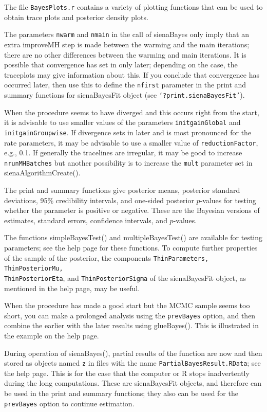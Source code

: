 \documentclass[a4paper,fleqn,11pt]{article}
\newcommand{\+}{\, + \,}
\newcommand{\sfn}[1]{\textsf{#1}}
\newcommand{\R}{{\sf R }}
\begin{document}
The file \texttt{BayesPlots.r} contains a variety of plotting functions that 
can be used to obtain trace plots and posterior density plots.

The parameters \texttt{nwarm} and \texttt{nmain} in the call of 
\sfn{sienaBayes} only imply 
that an extra \sfn{improveMH} step is made between the warming and the 
main iterations; there are no other differences between the warming 
and main iterations. It is possible that convergence has set in only 
later; depending on the case, the traceplots may give information about this.
If you conclude that convergence has occurred later, then use this to 
define the \texttt{nfirst} parameter in the \sfn{print} and 
\sfn{summary} functions for 
\sfn{sienaBayesFit} object (see \texttt{`?print.sienaBayesFit'}).

When the procedure seems to have diverged and this occurs right
from the start, it is
advisable to use smaller values of the parameters \texttt{initgainGlobal}
and \texttt{initgainGroupwise}.
If divergence sets in later and is most pronounced
for the rate parameters, it may be advisable to use a smaller value of 
\texttt{reductionFactor}, e.g., 0.1.
If generally the tracelines are irregular, it may be good to increase
\texttt{nrunMHBatches} but another possibility is to increase 
the \texttt{mult} parameter set in \sfn{sienaAlgorithmCreate()}. 

The \sfn{print} and \sfn{summary} functions
give posterior means, posterior standard deviations, 95\% credibility intervals,
and one-sided posterior $p$-values 
for testing whether the parameter is positive or negative. 
These are the Bayesian versions of estimates, standard errors, 
confidence intervals, and $p$-values.

The functions \sfn{simpleBayesTest()} and \sfn{multipleBayesTest()}
are available for testing parameters; see the help page for these functions.
To compute further properties of the sample of the posterior, 
the components
\texttt{ThinParameters, ThinPosteriorMu, \\
ThinPosteriorEta}, and \texttt{ThinPosteriorSigma} of the 
\sfn{sienaBayesFit} object, as mentioned in the help page, may be useful.

When the procedure has made a good start but the MCMC sample seems too 
short, you can make a prolonged analysis using the \texttt{prevBayes} option, 
and then combine the earlier with the later results using \sfn{glueBayes()}. 
This is illustrated in the example on the help page.

During operation of \sfn{sienaBayes()}, partial results of the function 
are now and then stored 
as objects named \texttt{z} in files with the name
\texttt{PartialBayesResult.RData}; see the help page.
This is for the case that the computer or \R stops inadvertently
during the long computations.
These are \sfn{sienaBayesFit} objects, and therefore can be used in the
\sfn{print} and \sfn{summary} functions; they also can be used for
the \texttt{prevBayes} option to continue estimation.
\end{document}
